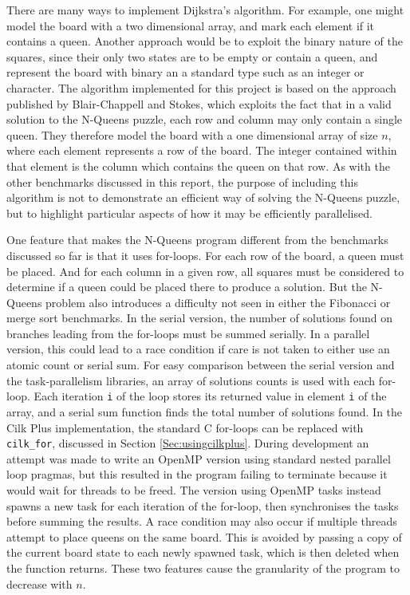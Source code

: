 \documentclass{report}
\begin{document}
There are many ways to implement Dijkstra's algorithm. For example, one might model the board with a two dimensional array, and mark each element if it contains a queen. Another approach would be to exploit the binary nature of the squares, since their only two states are to be empty or contain a queen, and represent the board with binary an a standard type such as an integer or character. The algorithm implemented for this project is based on the approach published by Blair-Chappell and Stokes\cite{Blair12}, which exploits the fact that in a valid solution to the N-Queens puzzle, each row and column may only contain a single queen. They therefore model the board with a one dimensional array of size \(n\), where each element represents a row of the board. The integer contained within that element is the column which contains the queen on that row. As with the other benchmarks discussed in this report, the purpose of including this algorithm is not to demonstrate an efficient way of solving the N-Queens puzzle, but to highlight particular aspects of how it may be efficiently parallelised.

One feature that makes the N-Queens program different from the benchmarks discussed so far is that it uses for-loops. For each row of the board, a queen must be placed. And for each column in a given row, all squares must be considered to determine if a queen could be placed there to produce a solution. But the N-Queens problem also introduces a difficulty not seen in either the Fibonacci or merge sort benchmarks. In the serial version, the number of solutions found on branches leading from the for-loops must be summed serially. In a parallel version, this could lead to a race condition if care is not taken to either use an atomic count or serial sum. For easy comparison between the serial version and the task-parallelism libraries, an array of solutions counts is used with each for-loop. Each iteration \verb!i! of the loop stores its returned value in element \verb!i! of the array, and a serial sum function finds the total number of solutions found. In the Cilk Plus implementation, the standard C for-loops can be replaced with \verb!cilk_for!, discussed in Section \ref{Sec:usingcilkplus}. During development an attempt was made to write an OpenMP version using standard nested parallel loop pragmas, but this resulted in the program failing to terminate because it would wait for threads to be freed. The version using OpenMP tasks instead spawns a new task for each iteration of the for-loop, then synchronises the tasks before summing the results. A race condition may also occur if multiple threads attempt to place queens on the same board. This is avoided by passing a copy of the current board state to each newly spawned task, which is then deleted when the function returns. These two features cause the granularity of the program to decrease with \(n\).
\end{document}
